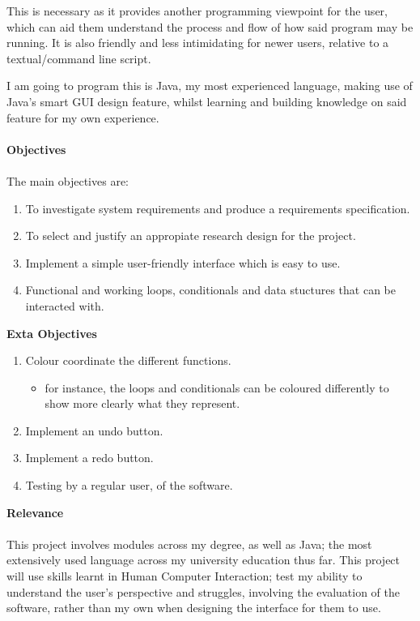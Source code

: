 \documentclass[a4paper, 12pt]{article}
\begin{document}
            This is necessary as it provides another programming viewpoint for the user,
            which can aid them understand the process and flow of how said program may be running.
            It is also friendly and less intimidating for newer users, relative to a textual/command
            line script.
                
            I am going to program this is Java, my most experienced language, making use of Java's
            smart GUI design feature, whilst learning and building knowledge on said feature for my
            own experience. \\\\
            \textbf{Objectives} \\\\
            The main objectives are:
            \begin{enumerate}
                \item To investigate system requirements and produce a requirements specification.
                \item To select and justify an appropiate research design for the project.
                \item Implement a simple user-friendly interface which is easy to use.
                \item Functional and working loops, conditionals and data stuctures that can be interacted
                with. \\
            \end{enumerate}        
            \textbf{Exta Objectives}
            \begin{enumerate}
                \item Colour coordinate the different functions.
                \begin{itemize}
                    \item for instance, the loops and conditionals can be coloured differently to show more
                    clearly what they represent.
                \end{itemize}
                \item Implement an undo button.
                \item Implement a redo button.
                \item Testing by a regular user, of the software.
            \end{enumerate}
            \textbf{Relevance} \\\\
            This project involves modules across my degree, as well as Java; the most extensively
            used language across my university education thus far. This project will use skills learnt
            in Human Computer Interaction; test my ability to understand the user's perspective and
            struggles, involving the evaluation of the software, rather than my own when designing
            the interface for them to use.
        
\end{document}
